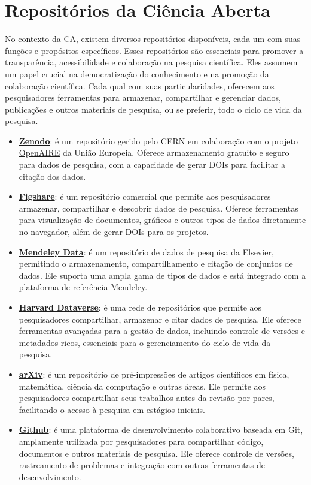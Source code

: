 \documentclass[
  a4paper,
]{book}
\providecommand{\tightlist}{%
  \setlength{\itemsep}{0pt}\setlength{\parskip}{0pt}}\usepackage{longtable,booktabs,array}
\begin{document}

\chapter{Repositórios da Ciência Aberta}\label{sec-osf}

No contexto da CA, existem diversos repositórios disponíveis, cada um
com suas funções e propósitos específicos. Esses repositórios são
essenciais para promover a transparência, acessibilidade e colaboração
na pesquisa científica. Eles assumem um papel crucial na democratização
do conhecimento e na promoção da colaboração científica. Cada qual com
suas particularidades, oferecem aos pesquisadores ferramentas para
armazenar, compartilhar e gerenciar dados, publicações e outros
materiais de pesquisa, ou se preferir, todo o ciclo de vida da pesquisa.

\begin{itemize}
\tightlist
\item
  \href{https://www.zenodo.org}{\textbf{Zenodo}}: é um repositório
  gerido pelo CERN em colaboração com o projeto
  \href{https://www.openaire.eu/}{OpenAIRE} da União Europeia. Oferece
  armazenamento gratuito e seguro para dados de pesquisa, com a
  capacidade de gerar DOIs para facilitar a citação dos dados.
\item
  \href{https://www.figshare.com}{\textbf{Figshare}}: é um repositório
  comercial que permite aos pesquisadores armazenar, compartilhar e
  descobrir dados de pesquisa. Oferece ferramentas para visualização de
  documentos, gráficos e outros tipos de dados diretamente no navegador,
  além de gerar DOIs para os projetos.
\item
  \href{https://data.mendeley.com}{\textbf{Mendeley Data}}: é um
  repositório de dados de pesquisa da Elsevier, permitindo o
  armazenamento, compartilhamento e citação de conjuntos de dados. Ele
  suporta uma ampla gama de tipos de dados e está integrado com a
  plataforma de referência Mendeley.
\item
  \href{https://dataverse.harvard.edu}{\textbf{Harvard Dataverse}}: é
  uma rede de repositórios que permite aos pesquisadores compartilhar,
  armazenar e citar dados de pesquisa. Ele oferece ferramentas avançadas
  para a gestão de dados, incluindo controle de versões e metadados
  ricos, essenciais para o gerenciamento do ciclo de vida da pesquisa.
\item
  \href{https://arxiv.org}{\textbf{arXiv}}: é um repositório de
  pré-impressões de artigos científicos em física, matemática, ciência
  da computação e outras áreas. Ele permite aos pesquisadores
  compartilhar seus trabalhos antes da revisão por pares, facilitando o
  acesso à pesquisa em estágios iniciais.
\item
  \href{https://github.com}{\textbf{Github}}: é uma plataforma de
  desenvolvimento colaborativo baseada em Git, amplamente utilizada por
  pesquisadores para compartilhar código, documentos e outros materiais
  de pesquisa. Ele oferece controle de versões, rastreamento de
  problemas e integração com outras ferramentas de desenvolvimento.
\end{itemize}
\end{document}
